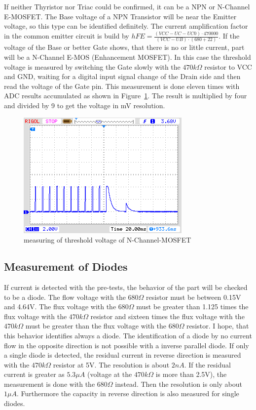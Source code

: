 If neither Thyristor nor Triac could be confirmed, it can be a NPN or N-Channel E-MOSFET.
The Base voltage of a NPN Transistor will be near the Emitter voltage, so this type can be identified definitely.
The current amplification factor in the common emitter circuit is build by \(hFE = \frac{(VCC-UC-UC0)\cdot 470000}{(VCC-UB)\cdot (680+22)}\).
If the voltage of the Base or better Gate  shows, that there is no or little current, part will be a N-Channel E-MOS 
(Enhancement MOSFET). In this case the threshold voltage is measured by switching the Gate slowly with
the \(470k\Omega\) resistor to VCC and GND, waiting for a digital input signal change of the Drain side and
then read the voltage of the Gate pin. This measurement is done eleven times with ADC results accumulated as
shown in Figure~\ref{fig:eleven}. The result is multiplied by four and divided by 9 to get the voltage in mV resolution.
\begin{figure}[H]
\centering
\includegraphics[]{../PNG/IRFU120gate.png}
\caption{measuring of threshold voltage of N-Channel-MOSFET}
\label{fig:eleven}
\end{figure}

\subsection{Measurement of Diodes}
\label{sec:diode}
If current is detected with the pre-tests, the behavior of the part will be checked to
be a diode. The flow voltage with the \(680\Omega\) resistor must be between 0.15V and 4.64V.
The flux voltage with the \(680\Omega\) must be greater than 1.125 times the flux voltage with
the \(470k\Omega\) resistor and sixteen times the flux voltage with the \(470k\Omega\) must be
greater than the flux voltage with the \(680\Omega\) resistor.
I hope, that this behavior identifies always a diode. The identification of a diode by no current flow
in the opposite direction is not possible with a inverse parallel diode.
If only a single diode is detected, the residual current in reverse direction is measured with
the \(470k\Omega\) resistor at 5V. The resolution is about \(2nA\).
If the residual current is greater as \(5.3\mu A\) (voltage at
the \(470k\Omega\) is more than 2.5V), the measurement is done with the \(680\Omega\) instead.
Then the resolution is only about \(1\mu A\).
Furthermore  the capacity in reverse direction is also measured for single diodes.




